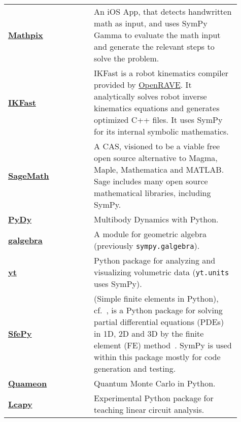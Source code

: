 \begin{longtable}[htbc]{>{\raggedright}p{0.14\linewidth}p{0.14\linewidth}p{0.63\linewidth}}
\href{http://mathpix.com/}{\textbf{Mathpix}}~\cite{Mathpix} &  & An iOS App, that detects handwritten math as input, and uses
  SymPy Gamma to evaluate the math input and generate the relevant
  steps to solve the problem. \\

\href{http://openrave.org/docs/latest_stable/openravepy/ikfast/}{\textbf{IKFast}}~\cite{diankov2010ikfast} &  &
  IKFast is a robot kinematics compiler provided by
  \href{http://openrave.org/}{OpenRAVE}. It analytically solves robot inverse
  kinematics equations and generates optimized C++ files. It uses SymPy for
  its internal symbolic mathematics. \\

\href{http://www.sagemath.org/}{\textbf{SageMath}}~\cite{sagemath} &  & A CAS, visioned to be
  a viable free open source alternative to Magma, Maple, Mathematica and
  MATLAB\@. Sage includes many open source mathematical libraries, including
  SymPy. \\

\href{http://www.pydy.org/}{\textbf{PyDy}}~\cite{gede2013constrained} &  & Multibody Dynamics with
  Python. \\

\href{https://github.com/brombo/galgebra}{\textbf{galgebra}}~\cite{galgebra} &  &
  A module for geometric algebra (previously \texttt{sympy.galgebra}). \\

\href{http://yt-project.org/}{\textbf{yt}}~\cite{2011ApJS..192....9T} &  & Python package for
  analyzing and visualizing volumetric data (\texttt{yt.units} uses SymPy). \\

\href{http://sfepy.org/}{\textbf{SfePy}}~\cite{cimrman2014sfepy} &  & (Simple finite elements in Python),
  cf.~\cite{cimrman2014sfepy}, is a Python package for solving partial
  differential equations (PDEs) in 1D, 2D and 3D by the finite element (FE)
  method~\cite{Zienkiewicz2013FEM}. SymPy is used within this package mostly for
  code generation and testing. \\

\href{http://quameon.sourceforge.net/}{\textbf{Quameon}}~\cite{quameon} &  & Quantum
  Monte Carlo in Python. \\

\href{http://lcapy.elec.canterbury.ac.nz/}{\textbf{Lcapy}}~\cite{lcapy} &  &
  Experimental Python package for teaching linear circuit analysis. \\
\bottomrule
\end{longtable}
